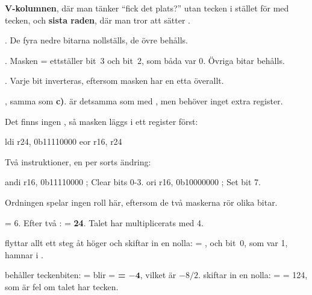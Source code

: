 \textbf{V-kolumnen}, där man tänker \enquote{fick det plats?} utan tecken
i stället för med tecken, och \textbf{sista raden}, där man tror att  sätter .

. De fyra nedre bitarna nollställs, de övre behålls.

. Masken  =  ettställer bit~3 och bit~2, som
båda var 0. Övriga bitar behålls.

. Varje bit inverteras, eftersom masken har en etta överallt.

, samma som \textbf{c)}.  är detsamma som  med
, men behöver inget extra register.



Det finns ingen , så masken läggs i ett register först:

\begin{asmcode}
    ldi r24, 0b11110000
    eor r16, r24
\end{asmcode}


Två instruktioner, en per sorts ändring:

\begin{asmcode}
    andi r16, 0b11110000            ; Clear bits 0-3.
    ori r16, 0b10000000             ; Set bit 7.
\end{asmcode}

\noindent Ordningen spelar ingen roll här, eftersom de två maskerna rör olika bitar.

 = 6. Efter två :  = \textbf{24}. Talet har
multiplicerats med 4.

 flyttar allt ett steg åt höger och skiftar in en nolla:  =
\textbf{}, och bit~0, som var 1, hamnar i \textbf{}.

 behåller teckenbiten:  =  blir  =
\textbf{ = $\mathbf{-4}$}, vilket är $-8 / 2$.  skiftar in en nolla:
 =  = 124, som är fel om talet har tecken.

\leavevmode

